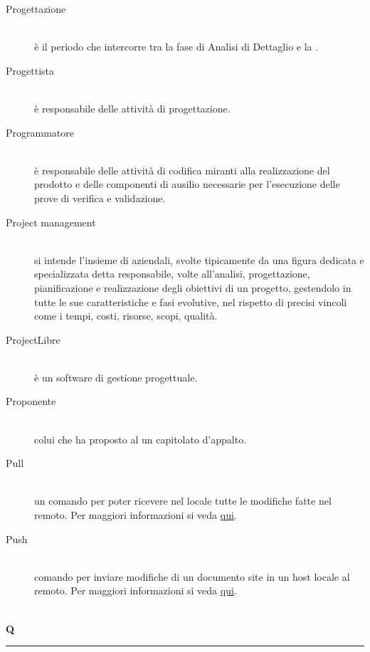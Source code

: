 \documentclass[12pt,a4paper]{article}
\begin{document}
\begin{description}
\item[Progettazione] 
\hfill\\ è il periodo che intercorre tra la fase di Analisi di Dettaglio e la \RP.

\item[Progettista] 
\hfill\\ è responsabile delle attività di progettazione.

\item[Programmatore] 
\hfill\\ è responsabile delle attività di codifica miranti alla realizzazione del prodotto e delle componenti di ausilio necessarie per l'esecuzione delle prove di verifica e validazione.

\item[Project management] 
\hfill\\ si intende l'insieme di  aziendali, svolte tipicamente da una figura dedicata e specializzata detta responsabile, volte all'analisi, progettazione, pianificazione e realizzazione degli obiettivi di un progetto, gestendolo in tutte le sue caratteristiche e fasi evolutive, nel rispetto di precisi vincoli come i tempi, costi, risorse, scopi, qualità.

\item[ProjectLibre] 
\hfill\\ è un software di gestione progettuale.

\item[Proponente] 
\hfill\\ colui che ha proposto al  un capitolato d'appalto.

\item[Pull] 
\hfill\\ un comando  per poter ricevere nel locale tutte le modifiche fatte nel  remoto. Per maggiori informazioni si veda \href{https://git-scm.com/docs/}{qui}.

\item[Push] 
\hfill\\ comando  per inviare modifiche di un documento site in un host locale al  remoto. Per maggiori informazioni si veda \href{https://git-scm.com/docs/}{qui}.
\end{description}

\newpage

\begin{center}
\hfill\\
	\LARGE \textbf{Q}
\hfill\\
\rule[15pt]{30pt}{0.5pt}
\end{center}
\end{document}

